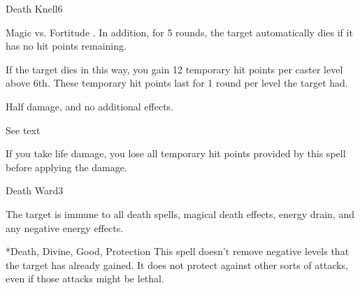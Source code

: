 \begin{spellsection}{Death Knell}{6}
\begin{spellheader}
\end{spellheader}
\begin{spellcontent}
    \begin{spelltargetinginfo}
    \end{spelltargetinginfo}
    \begin{spelleffects}
        \begin{spellattack}{Magic vs. Fortitude}
            \spellsuccess {}. In addition, for 5 rounds, the target automatically dies if it has no hit points remaining.
            
            If the target dies in this way, you gain 12 temporary hit points  per caster level above 6th. These temporary hit points last for 1 round per level the target had.

            \spellfailure Half damage, and no additional effects.
        \end{spellattack}
        \spelldur See text
    \end{spelleffects}
\end{spellcontent}
\begin{spellfooter}
    \spellnotes If you take life damage, you lose all temporary hit points provided by this spell before applying the damage.
\end{spellfooter}
\end{spellsection}

\begin{spellsection}{Death Ward}{3}
\begin{spellheader}
\end{spellheader}
\begin{spellcontent}
    \begin{spelltargetinginfo}
    \end{spelltargetinginfo}
    \begin{spelleffects}
        \spelleffect The target is immune to all death spells, magical death effects, energy drain, and any negative energy effects.
        \spelldur \durshort
    \end{spelleffects}
\end{spellcontent}
\begin{spellfooter}
    *{Death, Divine, Good, Protection}
    \spellnotes This spell doesn't remove negative levels that the target has already gained. It does not protect against other sorts of attacks, even if those attacks might be lethal.
\end{spellfooter}
\end{spellsection}

